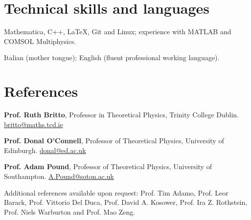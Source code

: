 \documentclass[11pt,a4paper,sans]{moderncv}
\newcommand{\referenceitem}[3]{%
  \par\noindent\textbf{#1}, #2. \href{mailto:#3}{#3}\par\vspace{0.14em}%
}
\begin{document}
\section{Technical skills and languages}

{Mathematica, C++, \LaTeX, Git and Linux; experience with MATLAB and COMSOL Multiphysics.}

{Italian (mother tongue); English (fluent professional working language).}


\section{References}
\referenceitem{Prof. Ruth Britto}{Professor in Theoretical Physics, Trinity College Dublin}{britto@maths.tcd.ie}
\referenceitem{Prof. Donal O'Connell}{Professor of Theoretical Physics, University of Edinburgh}{donal@ed.ac.uk}
\referenceitem{Prof. Adam Pound}{Professor of Theoretical Physics, University of Southampton}{A.Pound@soton.ac.uk}
\par\noindent Additional references available upon request: Prof. Tim Adamo, Prof. Leor Barack, Prof. Vittorio Del Duca, Prof. David A. Kosower, Prof. Ira Z. Rothstein, Prof. Niels Warburton and Prof. Mao Zeng.
\end{document}
